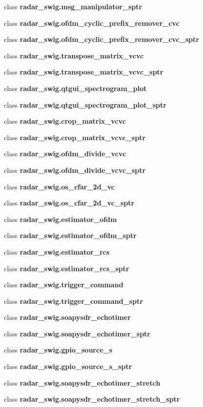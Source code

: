 \begin{DoxyCompactItemize}
\item 
class {\bf radar\+\_\+swig.\+msg\+\_\+manipulator\+\_\+sptr}
\item 
class {\bf radar\+\_\+swig.\+ofdm\+\_\+cyclic\+\_\+prefix\+\_\+remover\+\_\+cvc}
\item 
class {\bf radar\+\_\+swig.\+ofdm\+\_\+cyclic\+\_\+prefix\+\_\+remover\+\_\+cvc\+\_\+sptr}
\item 
class {\bf radar\+\_\+swig.\+transpose\+\_\+matrix\+\_\+vcvc}
\item 
class {\bf radar\+\_\+swig.\+transpose\+\_\+matrix\+\_\+vcvc\+\_\+sptr}
\item 
class {\bf radar\+\_\+swig.\+qtgui\+\_\+spectrogram\+\_\+plot}
\item 
class {\bf radar\+\_\+swig.\+qtgui\+\_\+spectrogram\+\_\+plot\+\_\+sptr}
\item 
class {\bf radar\+\_\+swig.\+crop\+\_\+matrix\+\_\+vcvc}
\item 
class {\bf radar\+\_\+swig.\+crop\+\_\+matrix\+\_\+vcvc\+\_\+sptr}
\item 
class {\bf radar\+\_\+swig.\+ofdm\+\_\+divide\+\_\+vcvc}
\item 
class {\bf radar\+\_\+swig.\+ofdm\+\_\+divide\+\_\+vcvc\+\_\+sptr}
\item 
class {\bf radar\+\_\+swig.\+os\+\_\+cfar\+\_\+2d\+\_\+vc}
\item 
class {\bf radar\+\_\+swig.\+os\+\_\+cfar\+\_\+2d\+\_\+vc\+\_\+sptr}
\item 
class {\bf radar\+\_\+swig.\+estimator\+\_\+ofdm}
\item 
class {\bf radar\+\_\+swig.\+estimator\+\_\+ofdm\+\_\+sptr}
\item 
class {\bf radar\+\_\+swig.\+estimator\+\_\+rcs}
\item 
class {\bf radar\+\_\+swig.\+estimator\+\_\+rcs\+\_\+sptr}
\item 
class {\bf radar\+\_\+swig.\+trigger\+\_\+command}
\item 
class {\bf radar\+\_\+swig.\+trigger\+\_\+command\+\_\+sptr}
\item 
class {\bf radar\+\_\+swig.\+soapysdr\+\_\+echotimer}
\item 
class {\bf radar\+\_\+swig.\+soapysdr\+\_\+echotimer\+\_\+sptr}
\item 
class {\bf radar\+\_\+swig.\+gpio\+\_\+source\+\_\+s}
\item 
class {\bf radar\+\_\+swig.\+gpio\+\_\+source\+\_\+s\+\_\+sptr}
\item 
class {\bf radar\+\_\+swig.\+soapysdr\+\_\+echotimer\+\_\+stretch}
\item 
class {\bf radar\+\_\+swig.\+soapysdr\+\_\+echotimer\+\_\+stretch\+\_\+sptr}
\end{DoxyCompactItemize}
